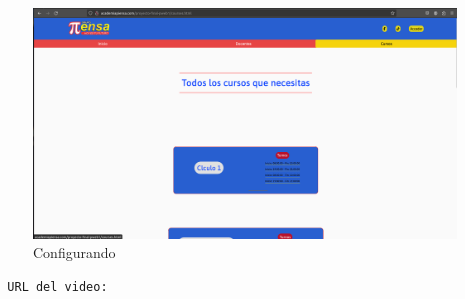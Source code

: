 \begin{figure}[H]
  \centering
  \includegraphics[width=1.0\textwidth]{img/Cursos.png}
  \caption{Configurando}
\end{figure}
\begin{verbatim}
  URL del video:
\end{verbatim}
